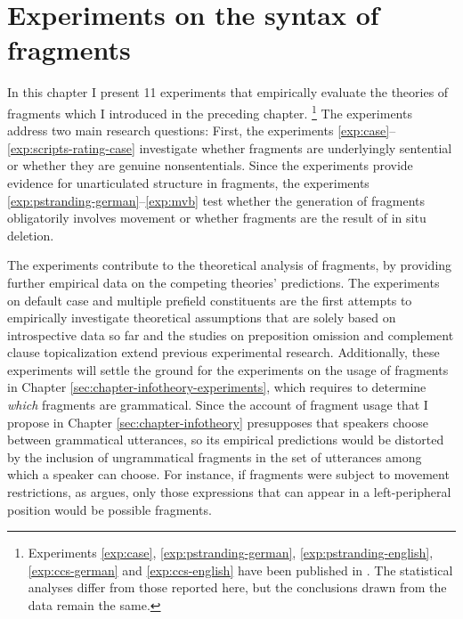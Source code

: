 \chapter[Experiments on the syntax of fragments]{Experiments on the syntax of fragments} \label{sec:chapter-experiments-syntax} 

In this chapter I present 11 experiments that empirically evaluate the theories of fragments which I introduced in the preceding chapter.%
%
\footnote{Experiments \ref{exp:case}, \ref{exp:pstranding-german}, \ref{exp:pstranding-english}, \ref{exp:ccs-german} and \ref{exp:ccs-english} have been published in \citet{lemke2017}. The statistical analyses differ from those reported here, but the conclusions drawn from the data remain the same.}\afterfn%
%
The experiments address two main research questions: First, the experiments \ref{exp:case}--\ref{exp:scripts-rating-case} investigate whether fragments are underlyingly sentential or whether they are genuine nonsententials. Since the experiments provide evidence for unarticulated structure in fragments, the experiments \ref{exp:pstranding-german}--\ref{exp:mvb} test whether the generation of fragments obligatorily involves movement or whether fragments are the result of in situ deletion. 

The experiments contribute to the theoretical analysis of fragments, by providing further empirical data on the competing theories' predictions. The experiments on default case and multiple prefield constituents are the first attempts to empirically investigate theoretical assumptions that are solely based on introspective data so far and the studies on preposition omission and complement clause topicalization extend previous experimental research. Additionally, these experiments will settle the ground for the experiments on the usage of fragments in Chapter \ref{sec:chapter-infotheory-experiments}, which requires to determine \textit{which} fragments are grammatical. Since the account of fragment usage that I propose in Chapter \ref{sec:chapter-infotheory} presupposes that speakers choose between grammatical utterances, so its empirical predictions would be distorted by the inclusion of ungrammatical fragments in the set of utterances among which a speaker can choose. For instance, if fragments were subject to movement restrictions, as \citet{merchant2004} argues, only those expressions that can appear in a left-peripheral position would be possible fragments.

